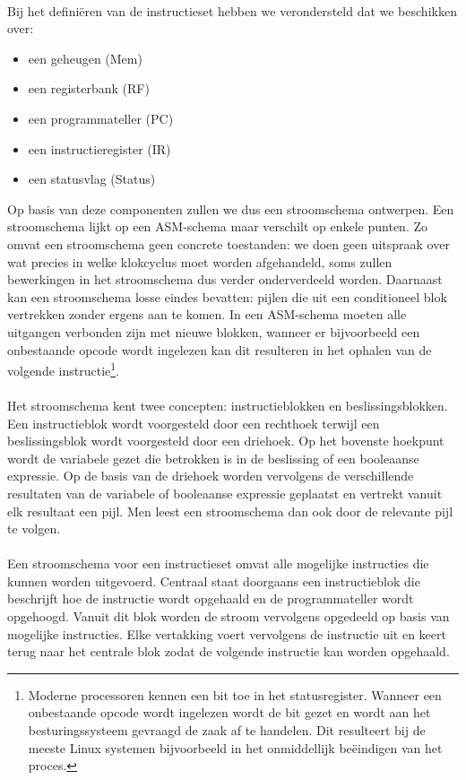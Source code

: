 \paragraph{}
Bij het defini\"eren van de instructieset hebben we verondersteld dat we beschikken over:
\begin{itemize}
 \item een geheugen (Mem)
 \item een registerbank (RF)
 \item een programmateller (PC)
 \item een instructieregister (IR)
 \item een statusvlag (Status)
\end{itemize}
Op basis van deze componenten zullen we dus een stroomschema ontwerpen. Een stroomschema lijkt op een ASM-schema maar verschilt op enkele punten. Zo omvat een stroomschema geen concrete toestanden: we doen geen uitspraak over wat precies in welke klokcyclus moet worden afgehandeld, soms zullen bewerkingen in het stroomschema dus verder onderverdeeld worden. Daarnaast kan een stroomschema losse eindes bevatten: pijlen die uit een conditioneel blok vertrekken zonder ergens aan te komen. In een ASM-schema moeten alle uitgangen verbonden zijn met nieuwe blokken, wanneer er bijvoorbeeld een onbestaande opcode wordt ingelezen kan dit resulteren in het ophalen van de volgende instructie\footnote{Moderne processoren kennen een bit toe in het statusregister. Wanneer een onbestaande opcode wordt ingelezen wordt de bit gezet en wordt aan het besturingssysteem gevraagd de zaak af te handelen. Dit resulteert bij de meeste Linux systemen bijvoorbeeld in het onmiddellijk be\"eindigen van het proces.}.
\paragraph{}
Het stroomschema kent twee concepten: instructieblokken en beslissingsblokken. Een instructieblok wordt voorgesteld door een rechthoek terwijl een beslissingsblok wordt voorgesteld door een driehoek. Op het bovenste hoekpunt wordt de variabele gezet die betrokken is in de beslissing of een booleaanse expressie. Op de basis van de driehoek worden vervolgens de verschillende resultaten van de variabele of booleaanse expressie geplaatst en vertrekt vanuit elk resultaat een pijl. Men leest een stroomschema dan ook door de relevante pijl te volgen.
\paragraph{}
Een stroomschema voor een instructieset omvat alle mogelijke instructies die kunnen worden uitgevoerd. Centraal staat doorgaans een instructieblok die beschrijft hoe de instructie wordt opgehaald en de programmateller wordt opgehoogd. Vanuit dit blok worden de stroom vervolgens opgedeeld op basis van mogelijke instructies. Elke vertakking voert vervolgens de instructie uit en keert terug naar het centrale blok zodat de volgende instructie kan worden opgehaald.
